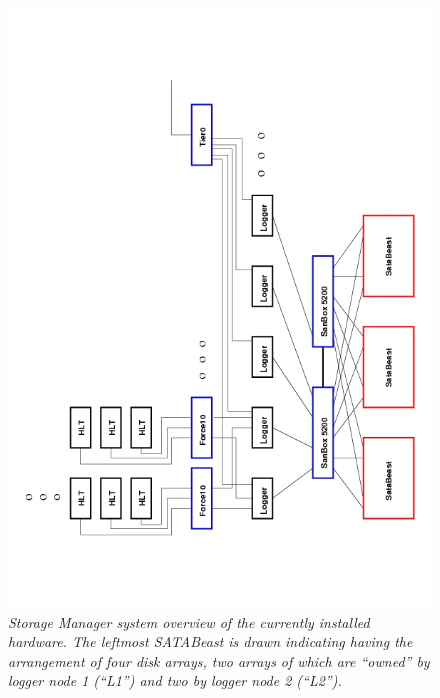 \begin{figure}[tb]
\begin{center}  
\includegraphics[width=1.0\textwidth]{Hardware/SMsystem}
\caption{\emph{ Storage Manager system overview of the currently installed hardware. 
The leftmost SATABeast is drawn indicating having the arrangement of four disk arrays, 
two arrays of which are ``owned'' by logger node 1 (``L1'') and two by logger node 2 (``L2'').}}
\label{fig:system}
\end{center}
\end{figure}  


